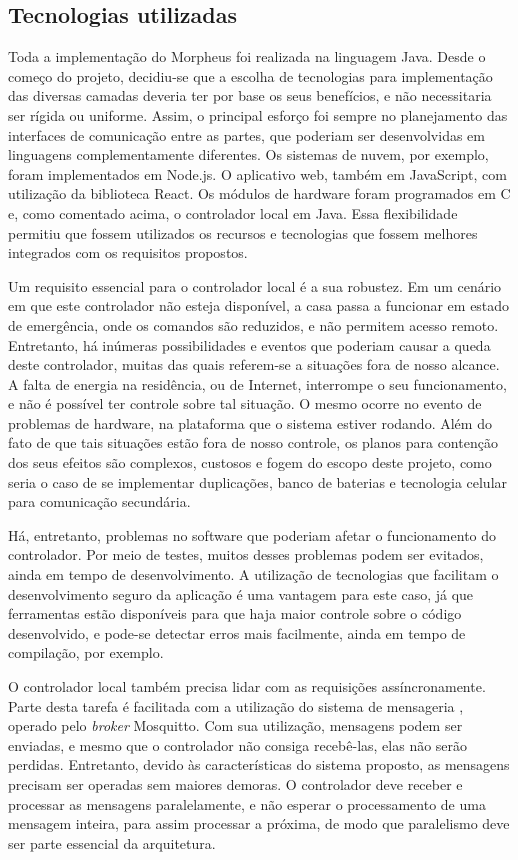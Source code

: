\subsection{Tecnologias utilizadas}
Toda a implementação do Morpheus foi realizada na linguagem Java. Desde o começo do projeto, decidiu-se que a escolha de tecnologias para implementação das diversas camadas deveria ter por base os seus benefícios, e não necessitaria ser rígida ou uniforme. Assim, o principal esforço foi sempre no planejamento das interfaces de comunicação entre as partes, que poderiam ser desenvolvidas em linguagens complementamente diferentes. Os sistemas de nuvem, por exemplo, foram implementados em Node.js. O aplicativo web, também em JavaScript, com utilização da biblioteca React. Os módulos de hardware foram programados em C e, como comentado acima, o controlador local em Java.
Essa flexibilidade permitiu que fossem utilizados os recursos e tecnologias que fossem melhores integrados com os requisitos propostos.

Um requisito essencial para o controlador local é a sua robustez. Em um cenário em que este controlador não esteja disponível, a casa passa a funcionar em estado de emergência, onde os comandos são reduzidos, e não permitem acesso remoto. Entretanto, há inúmeras possibilidades e eventos que poderiam causar a queda deste controlador, muitas das quais referem-se a situações fora de nosso alcance. A falta de energia na residência, ou de Internet, interrompe o seu funcionamento, e não é possível ter controle sobre tal situação. O mesmo ocorre no evento de problemas de hardware, na plataforma que o sistema estiver rodando. Além do fato de que tais situações estão fora de nosso controle, os planos para contenção dos seus efeitos são complexos, custosos e fogem do escopo deste projeto, como seria o caso de se implementar duplicações, banco de baterias e tecnologia celular para comunicação secundária.

Há, entretanto, problemas no software que poderiam afetar o funcionamento do controlador. Por meio de testes, muitos desses problemas podem ser evitados, ainda em tempo de desenvolvimento. A utilização de tecnologias que facilitam o desenvolvimento seguro da aplicação é uma vantagem para este caso, já que ferramentas estão disponíveis para que haja maior controle sobre o código desenvolvido, e pode-se detectar erros mais facilmente, ainda em tempo de compilação, por exemplo.

O controlador local também precisa lidar com as requisições assíncronamente. Parte desta tarefa é facilitada com a utilização do sistema de mensageria \wmqtt{}, operado pelo \textit{broker} Mosquitto. Com sua utilização, mensagens podem ser enviadas, e mesmo que o controlador não consiga recebê-las, elas não serão perdidas. Entretanto, devido às características do sistema proposto, as mensagens precisam ser operadas sem maiores demoras. O controlador deve receber e processar as mensagens paralelamente, e não esperar o processamento de uma mensagem inteira, para assim processar a próxima, de modo que paralelismo deve ser parte essencial da arquitetura.


